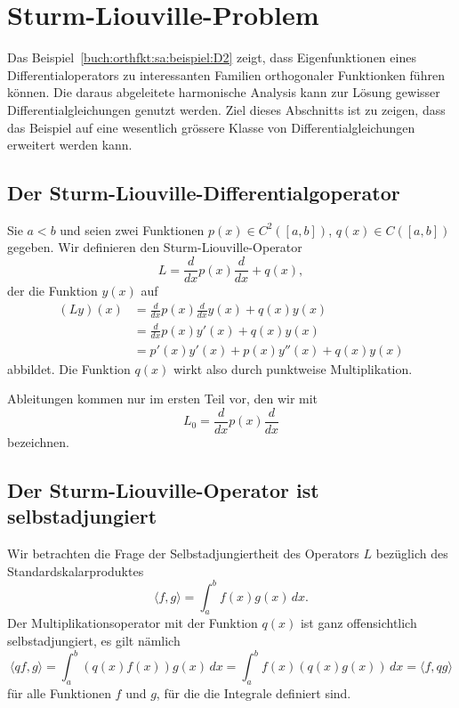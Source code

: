 %
%
%
\section{Sturm-Liouville-Problem
\label{buch:orthofkt:section:sturmliouville}}
Das Beispiel~\ref{buch:orthfkt:sa:beispiel:D2} zeigt, dass
Eigenfunktionen eines Differentialoperators zu interessanten
Familien orthogonaler Funktionken führen können.
Die daraus abgeleitete harmonische Analysis kann zur Lösung
gewisser Differentialgleichungen genutzt werden.
Ziel dieses Abschnitts ist zu zeigen, dass das Beispiel auf
eine wesentlich grössere Klasse von Differentialgleichungen
erweitert werden kann.

%
%
\subsection{Der Sturm-Liouville-Differentialgoperator}
Sie $a<b$ und seien zwei Funktionen
$p(x)\in C^2([a,b])$, $q(x)\in C([a,b])$ gegeben.
Wir definieren den Sturm-Liouville-Operator
\[
L = \frac{d}{dx} p(x) \frac{d}{dx} + q(x),
\]
der die Funktion $y(x)$ auf
\begin{align*}
(Ly)(x)
&=
\frac{d}{dx}p(x)\frac{d}{dx}y(x) + q(x)y(x)
\\
&=
\frac{d}{dx}p(x)y'(x) + q(x)y(x)
\\
&=
p'(x)y'(x)+p(x)y''(x)+q(x)y(x)
\end{align*}
abbildet.
Die Funktion $q(x)$ wirkt also durch punktweise Multiplikation.

Ableitungen kommen nur im ersten Teil vor, den wir mit
\[
L_0
=
\frac{d}{dx}p(x)\frac{d}{dx}
\]
bezeichnen.

%
%
\subsection{Der Sturm-Liouville-Operator ist selbstadjungiert}
Wir betrachten die Frage der Selbstadjungiertheit des
Operators $L$ bezüglich des Standardskalarproduktes
\[
\langle f,g\rangle
=
\int_a^b f(x)g(x)\,dx.
\]
Der Multiplikationsoperator mit der Funktion $q(x)$ ist ganz
offensichtlich selbstadjungiert, es gilt nämlich
\[
\langle qf,g\rangle
=
\int_a^b (q(x)f(x))g(x)\,dx
=
\int_a^b f(x)(q(x)g(x))\,dx
=
\langle f,qg\rangle
\]
für alle Funktionen $f$ und $g$, für die die Integrale definiert sind.

